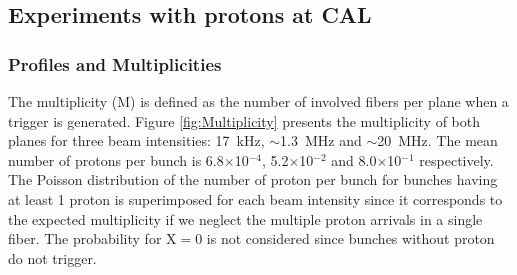 \documentclass[a4paper,11pt]{article}
\begin{document}
\subsection{Experiments with protons at CAL}
\subsubsection{Profiles and Multiplicities}
\label{Profiles_And_Multiplies}

The multiplicity (M) is defined as the number of involved fibers per plane when a trigger is generated.
Figure \ref{fig:Multiplicity} presents the multiplicity of both planes for three beam intensities: 17~kHz, $\sim$1.3~MHz and $\sim$20~MHz. The mean number of protons per bunch is 6.8$\times$10$^{-4}$, 5.2$\times$10$^{-2}$ and 8.0$\times$10$^{-1}$ respectively. The Poisson distribution of the number of proton per bunch for bunches having at least 1 proton is superimposed for each beam intensity since it corresponds to the expected multiplicity if we neglect the multiple proton arrivals in a single fiber. The probability for X$ = 0$ is not considered since bunches without proton do not trigger. 
\end{document}
